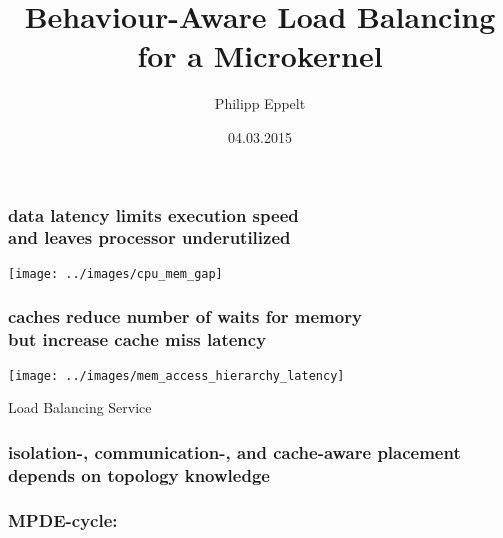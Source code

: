 \documentclass[utf8,10pt]{beamer}
\title[]{Behaviour-Aware Load Balancing for a Microkernel}
\author{Philipp Eppelt}
\date{04.03.2015}
\begin{document}
\maketitle

\large

\newcommand{\ft}[1]{\frametitle{\hfill #1}}


\begin{frame}
  \frametitle{data latency limits execution speed\\ and leaves processor
  underutilized}
  \centering
  \texttt{[image: ../images/cpu\_mem\_gap]}
\end{frame}


\begin{frame}
  \frametitle{caches reduce number of waits for memory\\ but increase cache
  miss latency}
  \centering
  \texttt{[image: ../images/mem\_access\_hierarchy\_latency]}
\end{frame}



\begin{frame}
  \centering
  \Large
  Load Balancing Service
\end{frame}

\begin{frame}
  \frametitle{isolation-, communication-, and cache-aware placement depends on
  topology knowledge}
  \centering
  \begin{minipage}[l]{.49\columnwidth}
    
  \end{minipage}
  \begin{minipage}[r]{.49\columnwidth}
    
  \end{minipage}
\end{frame}

\begin{frame}
  \frametitle{MPDE-cycle: }
  \centering
  
\end{frame}
\end{document}
